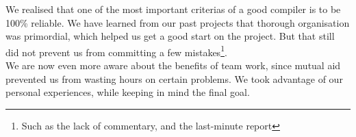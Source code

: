 \documentclass{scrartcl}
\begin{document}
We realised that one of the most important criterias of a good compiler is to be 100\% reliable.
We have learned from our past projects that thorough organisation was primordial, which helped us get a good start on the project. But that still did not prevent us from committing a few mistakes\footnote{Such as the lack of commentary, and the last-minute report}.\\

We are now even more aware about the benefits of team work, since mutual aid prevented us from wasting hours on certain problems. We took advantage of our personal experiences, while keeping in mind the final goal.
\end{document}
